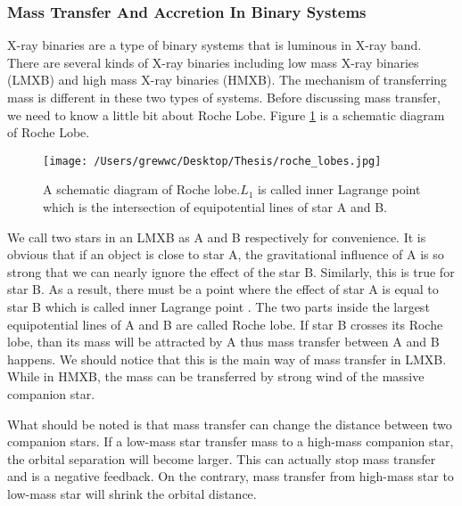 \documentclass[12pt]{report}
\begin{document}
            \subsubsection{Mass Transfer And Accretion In Binary Systems}
              X-ray binaries are a type of binary systems that is luminous in X-ray band. 
              There are several kinds of X-ray binaries including low mass X-ray binaries 
              (LMXB) and high mass X-ray binaries (HMXB). The mechanism of transferring mass 
              is different in these two types of systems. Before discussing mass 
              transfer, we need to know a little bit about Roche Lobe. Figure 
              \ref{fig:roche lobe} is a schematic diagram of Roche Lobe.
              \begin{figure}[h]
                \centering
                \texttt{[image: /Users/grewwc/Desktop/Thesis/roche\_lobes.jpg]}
                \caption{A schematic diagram of Roche lobe.\protect $L_{1}$ is called inner 
                          Lagrange point which is the intersection of equipotential lines 
                          of star A and B.}
                \label{fig:roche lobe}
              \end{figure}
              We call two stars in an LMXB as A and B respectively for convenience. It is 
              obvious that if an object is close to star A, the gravitational influence of A 
              is so strong that we can nearly ignore the effect of the star B. Similarly, 
              this is true for star B. As a result, there must be a point where the effect 
              of star A is equal to star B which is called inner Lagrange point 
              \cite{0004-637X-603-1-283}. The two parts inside the largest equipotential 
              lines of A and B are called Roche lobe. If star B crosses
              its Roche lobe, than its mass will be attracted by A thus mass transfer between 
              A and B happens. We should notice that this is the main way of mass transfer in 
              LMXB. While in HMXB, the mass can be transferred by strong wind of the massive 
              companion star. 

              What should be noted is that mass transfer can change the distance between two 
              companion stars. If a low-mass star transfer mass to a high-mass companion star,
              the orbital separation will become larger. This can actually stop mass transfer 
              and is a negative feedback. On the contrary, mass transfer from high-mass star 
              to low-mass star will shrink the orbital distance.
                       
\end{document}
